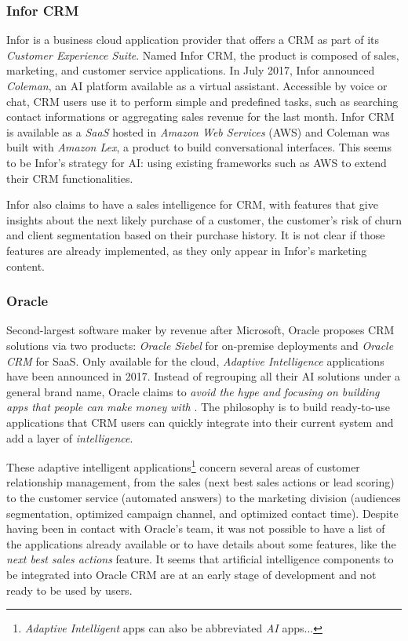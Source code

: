 \subsubsection*{Infor CRM}
Infor is a business cloud application provider that offers a CRM as part of its \textit{Customer Experience Suite}. Named Infor CRM, the product is composed of sales, marketing, and customer service applications. In July 2017, Infor announced \textit{Coleman}, an AI platform available as a virtual assistant. Accessible by voice or chat, CRM users use it to perform simple and predefined tasks, such as searching contact informations or aggregating sales revenue for the last month. Infor CRM is available as a \textit{SaaS} hosted in \textit{Amazon Web Services} (AWS) and Coleman was built with \textit{Amazon Lex}, a product to build conversational interfaces. This seems to be Infor's strategy for AI: using existing frameworks such as AWS to extend their CRM functionalities.

Infor also claims to have a sales intelligence for CRM, with features that give insights about the next likely purchase of a customer, the customer's risk of churn and client segmentation based on their purchase history. It is not clear if those features are already implemented, as they only appear in Infor's marketing content.\nocite{infor-website}


\subsubsection*{Oracle}
Second-largest software maker by revenue after Microsoft, Oracle proposes CRM solutions via two products: \textit{Oracle Siebel} for on-premise deployments and \textit{Oracle CRM} for SaaS. Only available for the cloud, \textit{Adaptive Intelligence} applications have been announced in 2017. Instead of regrouping all their AI solutions under a general brand name, Oracle claims to \textit{avoid the hype and focusing on building apps that people can make money with }\cite{crm-techmerge}. The philosophy is to build ready-to-use applications that CRM users can quickly integrate into their current system and add a layer of \textit{intelligence}.

These adaptive intelligent applications\footnote{\textit{Adaptive Intelligent} apps can also be abbreviated \textit{AI} apps...} concern several areas of customer relationship management, from the sales (next best sales actions or lead scoring) to the customer service (automated answers) to the marketing division (audiences segmentation, optimized campaign channel, and optimized contact time). Despite having been in contact with Oracle's team, it was not possible to have a list of the applications already available or to have details about some features, like the \textit{next best sales actions} feature. It seems that artificial intelligence components to be integrated into Oracle CRM are at an early stage of development and not ready to be used by users. 


